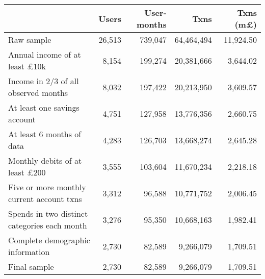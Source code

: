 \begin{tabular}{lrrrr}
\toprule
                                             &  Users & User-months &       Txns & Txns (m\pounds) \\
\midrule
                                  Raw sample & 26,513 &     739,047 & 64,464,494 &       11,924.50 \\
        Annual income of at least \pounds10k &  8,154 &     199,274 & 20,381,666 &        3,644.02 \\
        Income in 2/3 of all observed months &  8,032 &     197,422 & 20,213,950 &        3,609.57 \\
                At least one savings account &  4,751 &     127,958 & 13,776,356 &        2,660.75 \\
                   At least 6 months of data &  4,283 &     126,703 & 13,668,274 &        2,645.28 \\
       Monthly debits of at least \pounds200 &  3,555 &     103,604 & 11,670,234 &        2,218.18 \\
   Five or more monthly current account txns &  3,312 &      96,588 & 10,771,752 &        2,006.45 \\
Spends in two distinct categories each month &  3,276 &      95,350 & 10,668,163 &        1,982.41 \\
            Complete demographic information &  2,730 &      82,589 &  9,266,079 &        1,709.51 \\
                                Final sample &  2,730 &      82,589 &  9,266,079 &        1,709.51 \\
\bottomrule
\end{tabular}
